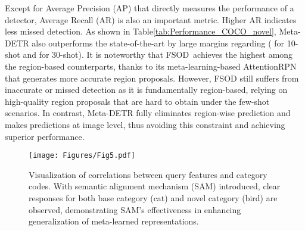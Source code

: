 \documentclass[10pt,twocolumn,letterpaper]{article}
\begin{document}
Except for Average Precision (AP) that directly measures the performance of a detector, Average Recall (AR) is also an important metric. Higher AR indicates less missed detection. As shown in Table\;\ref{tab:Performance_COCO_novel}, Meta-DETR also outperforms the state-of-the-art by large margins regarding  ( for 10-shot and  for 30-shot). It is noteworthy that FSOD\,\cite{fsod} achieves the highest  among the region-based counterparts, thanks to its meta-learning-based AttentionRPN that generates more accurate region proposals. However, FSOD still suffers from inaccurate or missed detection as it is fundamentally region-based, relying on high-quality region proposals that are hard to obtain under the few-shot scenarios. In contrast, Meta-DETR fully eliminates region-wise prediction and makes predictions at image level, thus avoiding this constraint and achieving superior performance.



\begin{table}
\begin{center}
\end{center}
\vspace*{-1.8mm}
\caption{Ablation studies over several design choices of Meta-DETR. Results for novel categories are averaged over multiple runs on the category split 1 of Pascal VOC.}
\label{tab:ablation1}
\end{table} 


\begin{figure}[t!] 
\begin{center}
   \texttt{[image: Figures/Fig5.pdf]}
\end{center}
\vspace*{-1.8mm}
   \caption{Visualization of correlations between query features and category codes. With semantic alignment mechanism (SAM) introduced, clear responses for both base category (cat) and novel category (bird) are observed, demonstrating SAM's effectiveness in enhancing generalization of meta-learned representations.}
\label{fig:fig5}
\vspace*{-1.0mm}
\end{figure}
\end{document}
